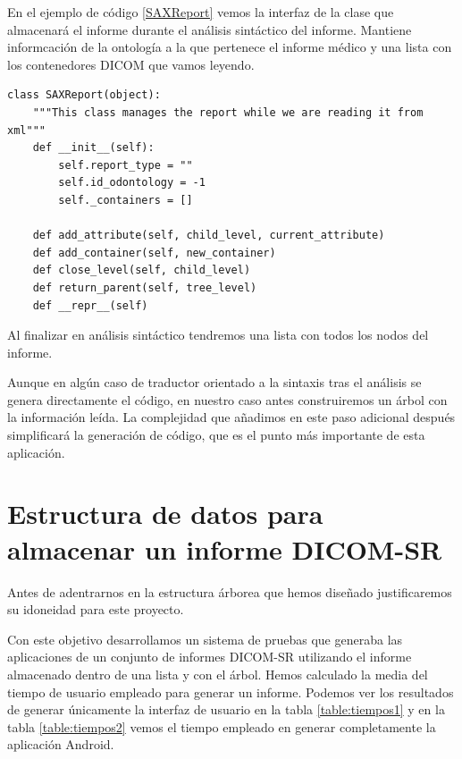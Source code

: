 En el ejemplo de código \ref{SAXReport} vemos la interfaz  de la clase que almacenará el informe durante el análisis sintáctico del informe. Mantiene informcación de la ontología a la que pertenece el informe médico y una lista con los contenedores DICOM que vamos leyendo.\par

\begin{lstlisting}[label=SAXReport,caption=Clase que almacena información durante el análisis de un informe]
class SAXReport(object):
    """This class manages the report while we are reading it from xml"""
    def __init__(self):
        self.report_type = ""
        self.id_odontology = -1
        self._containers = []

    def add_attribute(self, child_level, current_attribute)
    def add_container(self, new_container)
    def close_level(self, child_level)
    def return_parent(self, tree_level)
	def __repr__(self)
\end{lstlisting}

Al finalizar en análisis sintáctico tendremos una lista con todos los nodos del informe.\par 
Aunque en algún caso de traductor orientado a la sintaxis tras el análisis se genera directamente el código, en nuestro caso antes construiremos un árbol con la información leída. La complejidad que añadimos en este paso adicional después simplificará la generación de código, que es el punto más importante de esta aplicación.\par


\section[Árbol DICOM-SR]{Estructura de datos para almacenar un informe DICOM-SR%
              }
\label{sec:better_tree}
Antes de adentrarnos en la estructura árborea que hemos diseñado justificaremos su idoneidad para este proyecto.\par
Con este objetivo desarrollamos un sistema de pruebas que generaba las aplicaciones de un conjunto de informes DICOM-SR utilizando el informe almacenado dentro de una lista y con el árbol. Hemos calculado la media del tiempo de usuario empleado para generar un informe. Podemos ver los resultados de generar únicamente la interfaz de usuario en la tabla \ref{table:tiempos1} y en la tabla \ref{table:tiempos2} vemos el tiempo empleado en generar completamente la aplicación Android.\par


